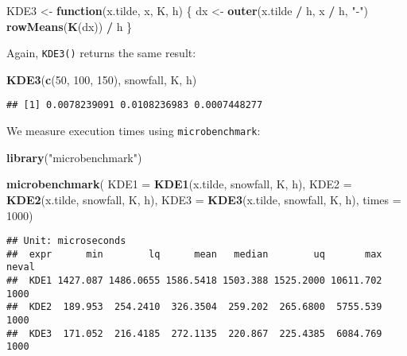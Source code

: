 \documentclass[
  a4paper,
]{article}
\newenvironment{Shaded}{\begin{snugshade}}{\end{snugshade}}
\newcommand{\AttributeTok}[1]{\textcolor[rgb]{0.13,0.29,0.53}{#1}}
\newcommand{\ControlFlowTok}[1]{\textcolor[rgb]{0.13,0.29,0.53}{\textbf{#1}}}
\newcommand{\DecValTok}[1]{\textcolor[rgb]{0.00,0.00,0.81}{#1}}
\newcommand{\FunctionTok}[1]{\textcolor[rgb]{0.13,0.29,0.53}{\textbf{#1}}}
\newcommand{\NormalTok}[1]{#1}
\newcommand{\OtherTok}[1]{\textcolor[rgb]{0.56,0.35,0.01}{#1}}
\newcommand{\SpecialCharTok}[1]{\textcolor[rgb]{0.81,0.36,0.00}{\textbf{#1}}}
\newcommand{\StringTok}[1]{\textcolor[rgb]{0.31,0.60,0.02}{#1}}
\theoremstyle{definition}
\theoremstyle{definition}
\theoremstyle{definition}
\theoremstyle{definition}
\theoremstyle{remark}
\begin{document}
\begin{Shaded}
\begin{Highlighting}[]
\NormalTok{KDE3 }\OtherTok{\textless{}{-}} \ControlFlowTok{function}\NormalTok{(x.tilde, x, K, h) \{}
\NormalTok{  dx }\OtherTok{\textless{}{-}} \FunctionTok{outer}\NormalTok{(x.tilde }\SpecialCharTok{/}\NormalTok{ h, x }\SpecialCharTok{/}\NormalTok{ h, }\StringTok{"{-}"}\NormalTok{)}
  \FunctionTok{rowMeans}\NormalTok{(}\FunctionTok{K}\NormalTok{(dx)) }\SpecialCharTok{/}\NormalTok{ h}
\NormalTok{\}}
\end{Highlighting}
\end{Shaded}

Again, \texttt{KDE3()} returns the same result:

\begin{Shaded}
\begin{Highlighting}[]
\FunctionTok{KDE3}\NormalTok{(}\FunctionTok{c}\NormalTok{(}\DecValTok{50}\NormalTok{, }\DecValTok{100}\NormalTok{, }\DecValTok{150}\NormalTok{), snowfall, K, h)}
\end{Highlighting}
\end{Shaded}

\begin{verbatim}
## [1] 0.0078239091 0.0108236983 0.0007448277
\end{verbatim}

We measure execution times using \texttt{microbenchmark}:

\begin{Shaded}
\begin{Highlighting}[]
\FunctionTok{library}\NormalTok{(}\StringTok{"microbenchmark"}\NormalTok{)}

\FunctionTok{microbenchmark}\NormalTok{(}
  \AttributeTok{KDE1 =} \FunctionTok{KDE1}\NormalTok{(x.tilde, snowfall, K, h),}
  \AttributeTok{KDE2 =} \FunctionTok{KDE2}\NormalTok{(x.tilde, snowfall, K, h),}
  \AttributeTok{KDE3 =} \FunctionTok{KDE3}\NormalTok{(x.tilde, snowfall, K, h),}
  \AttributeTok{times =} \DecValTok{1000}\NormalTok{)}
\end{Highlighting}
\end{Shaded}

\begin{verbatim}
## Unit: microseconds
##  expr      min        lq      mean   median        uq       max neval
##  KDE1 1427.087 1486.0655 1586.5418 1503.388 1525.2000 10611.702  1000
##  KDE2  189.953  254.2410  326.3504  259.202  265.6800  5755.539  1000
##  KDE3  171.052  216.4185  272.1135  220.867  225.4385  6084.769  1000
\end{verbatim}
\end{document}
